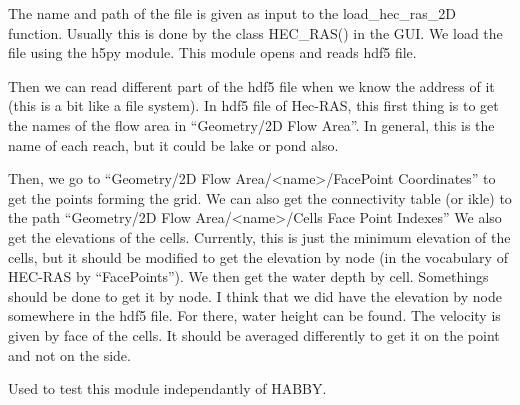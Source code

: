 \documentclass[letterpaper,10pt,english]{sphinxmanual}
\begin{document}
\begin{fulllineitems}
The name and path of the file is given as input to the load\_hec\_ras\_2D function. Usually this is done by the class
HEC\_RAS() in the GUI.  We load the file using the h5py module. This module opens and reads hdf5 file.

Then we can read different part of the hdf5 file when we know the address of it (this is a bit like a file system).
In hdf5 file of Hec-RAS, this first thing is to get the names of the flow area in “Geometry/2D Flow Area”. In
general, this is the name of each reach, but it could be lake or pond also.

Then, we go to “Geometry/2D Flow Area/\textless{}name\textgreater{}/FacePoint Coordinates” to get the points forming the grid.
We can also get the connectivity table (or ikle) to the path “Geometry/2D Flow Area/\textless{}name\textgreater{}/Cells Face Point Indexes”
We also get the elevations of the cells. Currently, this is just the minimum elevation of the cells, but it should
be modified to get the elevation by node (in the vocabulary of HEC-RAS by “FacePoints”). We then get the water depth
by cell. Somethings should be done to get it by node. I think that we did have the elevation by node somewhere in
the hdf5 file. For there, water height can be found.
The velocity is given by face of the cells. It should be averaged differently to get it on the point and
not on the side.

\end{fulllineitems}


\begin{fulllineitems}
\label{\detokenize{index:src.hec_ras2D.main}}
Used to test this module independantly of HABBY.

\end{fulllineitems}

\end{document}
